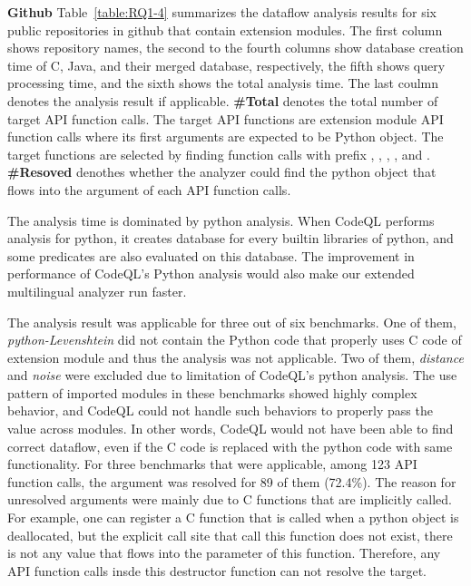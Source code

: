 

\textbf{Github}
Table~\ref{table:RQ1-4} summarizes the dataflow analysis results for six public
repositories in github that contain extension modules.
The first column shows repository names, the second to the fourth columns
show database creation time of C, Java, and their merged database,
respectively, the fifth shows query processing time, and the sixth shows the
total analysis time.  The last coulmn denotes the analysis result if
applicable. {\bf \#Total} denotes the total number of target API function
calls. The target API functions are extension module API function calls where
its first arguments are expected to be Python object.  The target functions are
selected by finding function calls with prefix ,
, , , and .
{\bf \#Resoved} denothes whether the analyzer could find the python object that
flows into the argument of each API function calls.

The analysis time is dominated by python analysis. When CodeQL performs analysis for python,
it creates database for every builtin libraries of python, and some predicates are
also evaluated on this database. The improvement in performance of CodeQL's Python analysis
would also make our extended multilingual analyzer run faster.

The analysis result was applicable for three out of six benchmarks.
One of them, {\it python-Levenshtein} did not contain the Python code
that properly uses C code of extension module and thus the analysis was not applicable.
Two of them, {\it distance} and {\it noise} were excluded due to limitation
of CodeQL's python analysis. The use pattern of imported modules in these benchmarks
showed highly complex behavior, and CodeQL could not handle such behaviors to properly pass the value
across modules. In other words, CodeQL would not have been able to find correct dataflow, even
if the C code is replaced with the python code with same functionality.
For three benchmarks that were applicable, among 123 API function calls, the argument was
resolved for 89 of them (72.4\%). The reason for unresolved arguments were
mainly due to C functions that are implicitly called. For example, one can register
a C function that is called when a python object is deallocated, but the explicit
call site that call this function does not exist, there is not any value that
flows into the parameter of this function. Therefore, any API function calls insde this
destructor function can not resolve the target.


